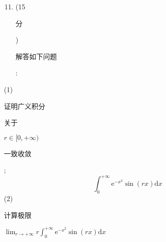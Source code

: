 \documentclass[10pt]{article}
\begin{document}
\begin{enumerate}
  \setcounter{enumi}{10}
  \item (15 \begin{CJK}{UTF8}{mj}分\end{CJK}) \begin{CJK}{UTF8}{mj}解答如下问题\end{CJK}:
\end{enumerate}
(1) \begin{CJK}{UTF8}{mj}证明广义积分\end{CJK}

\begin{CJK}{UTF8}{mj}关于\end{CJK} $r \in[0,+\infty)$ \begin{CJK}{UTF8}{mj}一致收敛\end{CJK};
$$
\int_{0}^{+\infty} \mathrm{e}^{-x^{2}} \sin (r x) \mathrm{d} x
$$
(2) \begin{CJK}{UTF8}{mj}计算极限\end{CJK} $\lim _{r \rightarrow+\infty} r \int_{0}^{+\infty} \mathrm{e}^{-x^{2}} \sin (r x) \mathrm{d} x$
\end{document}
